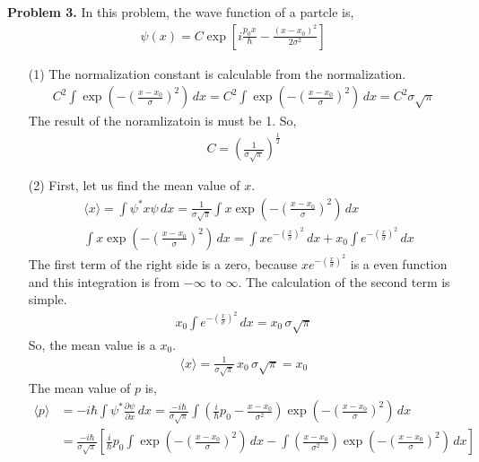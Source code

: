 \documentclass[aps,floatfix,nofootinbib,superscriptaddress,fleqn]{revtex4}
\begin{document}
\noindent \textbf{Problem 3.}
In this problem, the wave function of a partcle is,
\begin{align}
  \psi(x) = C\exp\left[
  i\frac{p_0 x}{\hbar} - \frac{{(x-x_0)}^2}{2\sigma^2} 
  \right]
  \end{align}
  \begin{itemize}
    \item[(1)] The normalization constant is calculable from the normalization.
    \begin{align}
      C^2\int \exp\left(-{\left(\frac{x-x_0}{\sigma} \right)}^2\right)\,dx 
      = C^2\int\exp\left(-{\left(\frac{x-x_0}{\sigma} \right)}^2\right)\,dx 
      = C^2\sigma \sqrt{\pi}
    \end{align}
    The result of the noramlizatoin is must be 1. So,
    \begin{align}
      C = {\left(\frac{1}{\sigma \sqrt{\pi}}\right)}^{\frac{1}{2}}
    \end{align}
    \item[(2)]First, let us find the mean value of $x$.
    \begin{align}
      &\langle x \rangle=\int\psi^*x\psi\,dx 
        = \frac{1}{\sigma\sqrt{\pi}}\int x \exp\left(-{\left( \frac{x-x_0}{\sigma} \right)}^2\right)\,dx \\
      &\int x \exp\left(-{\left( \frac{x-x_0}{\sigma} \right)}^2\right)\,dx 
        = \int x e^{-{\left(\frac{x}{\sigma}\right)}^2}\,dx 
          + x_0\int e^{-{\left(\frac{x}{\sigma}\right)}^2}\,dx
    \end{align}
    The first term of the right side is a zero, because $x e^{-{\left(\frac{x}{\sigma}\right)}^2}$ is a even function 
    and this integration is from $-\infty$ to $\infty$. The calculation of the second term is simple.
\begin{align}
  x_0\int e^{-{\left(\frac{x}{\sigma}\right)}^2}\,dx = x_0\,\sigma\sqrt{\pi}
\end{align}
So, the mean value is a $x_0$.
\begin{align}
  \langle x \rangle=\frac{1}{\sigma\sqrt{\pi}}\,x_0\,\sigma\sqrt{\pi} = x_0
\end{align}
The mean value of $p$ is,
\begin{align}
  \langle p \rangle &= -i\hbar \int \psi^* \frac{\partial \psi}{\partial x}\,dx 
                     = \frac{-i\hbar}{\sigma\sqrt{\pi}}\int \left(\frac{i}{\hbar}p_0-\frac{x-x_0}{\sigma^2}\right)\exp\left( -{\left(\frac{x-x_0}{\sigma}\right)}^2 \right)\,dx
              \\    &= \frac{-i\hbar}{\sigma\sqrt{\pi}}\left[ \frac{i}{\hbar}p_0\int\exp\left( -{\left(\frac{x-x_0}{\sigma}\right)}^2 \right)\,dx -\int\left( \frac{x-x_0}{\sigma^2}\right)\exp\left( -{\left(\frac{x-x_0}{\sigma}\right)}^2 \right)\,dx\right] 

\end{align}
\end{itemize}
\end{document}

